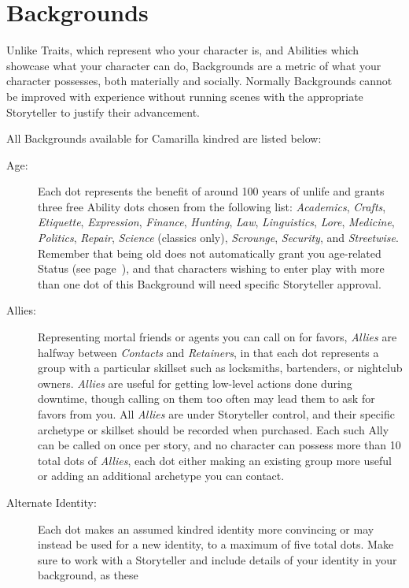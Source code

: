 \section{Backgrounds}
\label{sec:backgrounds}
Unlike Traits, which represent who your character is, and Abilities 
which showcase what your character can do, Backgrounds are a metric of 
what your character possesses, both materially and socially.  Normally 
Backgrounds cannot be improved with experience without running scenes 
with the appropriate Storyteller to justify their advancement.

All Backgrounds available for Camarilla kindred are listed below: \\

\begin{description}
	\item[Age:]  Each dot represents the benefit of around 100 years of unlife and grants 
	three free Ability dots chosen from the following list:  \emph{Academics}, 
	\emph{Crafts}, \emph{Etiquette}, \emph{Expression}, \emph{Finance}, 
	\emph{Hunting}, \emph{Law}, \emph{Linguistics}, \emph{Lore}, 
	\emph{Medicine}, \emph{Politics}, \emph{Repair}, \emph{Science} (classics only), 
	\emph{Scrounge}, \emph{Security}, and \emph{Streetwise}.  Remember that being old  
	does not automatically grant you age-related Status (see page~\pageref{sec:status}), 
	and that characters wishing to enter play with more than one dot of this Background 
	will need specific Storyteller approval.
	\item[Allies:]  Representing mortal friends or agents you can call on for favors, 
	\emph{Allies} are halfway between \emph{Contacts} and \emph{Retainers}, in that each 
	dot represents a group with a particular skillset such as locksmiths, bartenders, 
	or nightclub owners.  \emph{Allies} are useful for getting low-level actions done during 
	downtime, though calling on them too often may lead them to ask for favors from you.  
	All \emph{Allies} are under Storyteller control, and their specific archetype or 
	skillset should be recorded when purchased.  Each such Ally can be called on once per 
	story, and no character can possess more than 10 total dots of \emph{Allies}, each dot 
	either making an existing group more useful or adding an additional archetype you can contact.
	\item[Alternate Identity:]  Each dot makes an assumed kindred identity more convincing 
	or may instead be used for a new identity, to a maximum of five total dots.  Make sure to 
	work with a Storyteller and include details of your identity in your background, as these 

\end{description}
